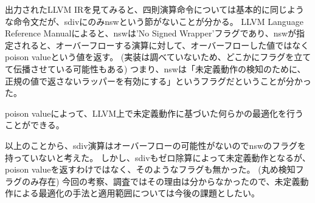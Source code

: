 出力されたLLVM IRを見てみると、四則演算命令については基本的に同じような命令文だが、sdivにのみnswという節がないことが分かる。
LLVM Language Reference Manual\cite{reference}によると、nswは'No Signed Wrapper'フラグであり、nswが指定されると、オーバーフローする演算に対して、オーバーフローした値ではなくpoison valueという値を返す。
(実装は調べていないため、どこかにフラグを立てて伝播させている可能性もある)
つまり、nswは「未定義動作の検知のために、正規の値で返さないラッパーを有効にする」というフラグだということが分かった。

poison valueによって、LLVM上で未定義動作に基づいた何らかの最適化を行うことができる。\cite{poison}

以上のことから、sdiv演算はオーバーフローの可能性がないのでnswのフラグを持っていないと考えた。
しかし、sdivもゼロ除算によって未定義動作となるが、poison valueを返すわけではなく、そのようなフラグも無かった。
(丸め検知フラグのみ存在)
今回の考察、調査ではその理由は分からなかったので、未定義動作による最適化の手法と適用範囲については今後の課題としたい。

